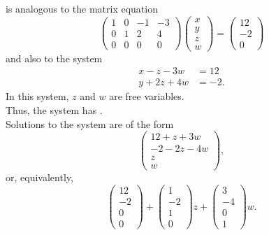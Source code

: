 \documentclass[12pt]{article}
\begin{document}
is analogous to the matrix equation
\begin{equation*}
	\begin{pmatrix}
		1 & 0 & -1 & -3 \\
		0 & 1 & 2 & 4 \\
		0 & 0 & 0 & 0
	\end{pmatrix}
	\begin{pmatrix} x \\ y \\ z \\ w \end{pmatrix}
	=
	\begin{pmatrix} 12 \\ -2 \\ 0 \end{pmatrix}
\end{equation*}
and also to the system
\begin{align*}
	x -z - 3w &= 12 \\
	y + 2z + 4w &= -2
	.
\end{align*}
In this system, $z$ and $w$ are free variables. \\
Thus, the system has .
\\[\baselineskip]
Solutions to the system are of the form
\begin{equation*}
	\boxed{
		\begin{pmatrix}
			12 + z + 3w \\
			-2 - 2z - 4w \\
			z \\
			w
		\end{pmatrix}
	}
	,
\end{equation*}
or, equivalently,
\begin{equation*}
	\boxed{
		\begin{pmatrix} 12 \\ -2 \\ 0 \\ 0 \end{pmatrix}
		+
		\begin{pmatrix} 1 \\ -2 \\ 1 \\ 0 \end{pmatrix} z
		+
		\begin{pmatrix} 3 \\ -4 \\ 0 \\ 1 \end{pmatrix} w
	}
	.
\end{equation*}
\newpage
\end{document}
